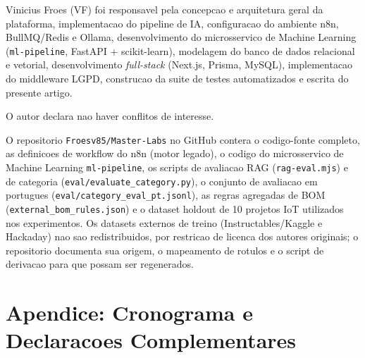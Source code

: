 \documentclass[portuguese]{sbcreviews-2025}%
\begin{document}
\begin{declarations}

\begin{contributions}
Vinicius Froes (VF) foi responsavel pela concepcao e arquitetura geral da plataforma, implementacao do pipeline de IA, configuracao do ambiente n8n, BullMQ/Redis e Ollama, desenvolvimento do microsservico de Machine Learning (\texttt{ml-pipeline}, FastAPI + scikit-learn), modelagem do banco de dados relacional e vetorial, desenvolvimento \textit{full-stack} (Next.js, Prisma, MySQL), implementacao do middleware LGPD, construcao da suite de testes automatizados e escrita do presente artigo.
\end{contributions}

\begin{interests}
O autor declara nao haver conflitos de interesse.
\end{interests}

\begin{materials}
O repositorio \texttt{Froesv85/Master-Labs} no GitHub contera o codigo-fonte completo, as definicoes de workflow do n8n (motor legado), o codigo do microsservico de Machine Learning \texttt{ml-pipeline}, os scripts de avaliacao RAG (\texttt{rag-eval.mjs}) e de categoria (\texttt{eval/evaluate\_category.py}), o conjunto de avaliacao em portugues (\texttt{eval/category\_eval\_pt.jsonl}), as regras agregadas de BOM (\texttt{external\_bom\_rules.json}) e o dataset holdout de 10 projetos IoT utilizados nos experimentos. Os datasets externos de treino (Instructables/Kaggle e Hackaday) nao sao redistribuidos, por restricao de licenca dos autores originais; o repositorio documenta sua origem, o mapeamento de rotulos e o script de derivacao para que possam ser regenerados.
\end{materials}

\end{declarations}




\appendix

\section*{Apendice: Cronograma e Declaracoes Complementares}
\end{document}
